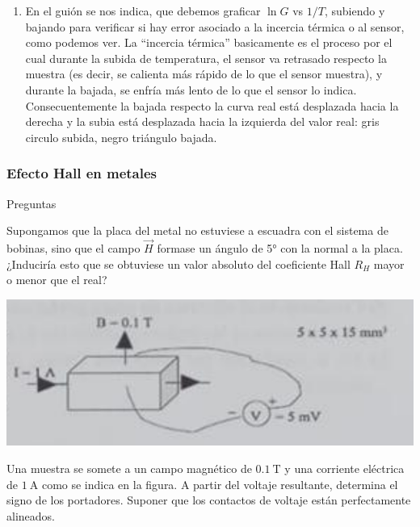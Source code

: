 \begin{enumerate}[label=\alph*)]
	\item En el guión se nos indica, que debemos graficar $\ln G$ vs $1/T$, subiendo y bajando para verificar si hay error asociado a la incercia  térmica o al sensor, como podemos ver. La ``incercia  térmica'' basicamente es el proceso por el cual durante la subida de temperatura, el sensor va retrasado respecto la muestra (es decir, se calienta más rápido de lo que el sensor muestra), y durante la bajada, se enfría más lento de lo que el sensor lo indica. Consecuentemente la bajada respecto la curva real está desplazada hacia la derecha y la subia está desplazada hacia la izquierda del valor real: gris circulo subida, negro triángulo bajada. 
\end{enumerate}

\vspace*{2em}

\begin{Enunciado}
	\subsubsection{Efecto Hall en metales}
	Preguntas
	\begin{enumerate}[label=\alph*)]
		\begin{minipage}{0.5\linewidth}
			\item Supongamos que la placa del metal no estuviese a escuadra con el sistema de bobinas, sino que el campo \( \vec{H} \) formase un ángulo de 5° con la normal a la placa. ¿Induciría esto que se obtuviese un valor absoluto del coeficiente Hall \( R_H \) mayor o menor que el real?

		\end{minipage}\hfill\begin{minipage}{0.45\linewidth}
			\includegraphics[width=0.9\linewidth]{Cuerpo/Ch_02/Examen_24_8.png}
		\end{minipage}
		\item Una muestra se somete a un campo magnético de \( 0.1 \ \text{T} \) y una corriente eléctrica de \( 1 \ \text{A}  \) como se indica en la figura. A partir del voltaje resultante, determina el signo de los portadores. Suponer que los contactos de voltaje están perfectamente alineados.
	\end{enumerate}
\end{Enunciado}

